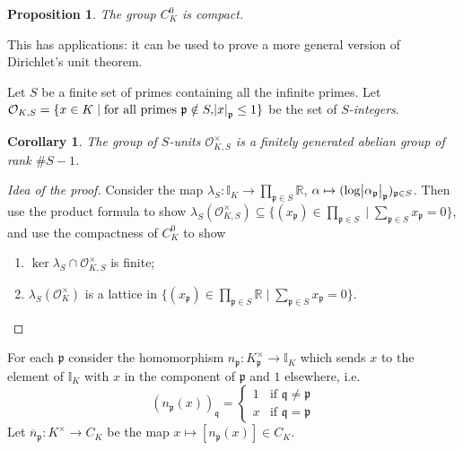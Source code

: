 \documentclass[11pt]{article}
\theoremstyle{definition}
\theoremstyle{plain}
\newtheorem{proposition}[definition]{Proposition}
\newtheorem{corollary}[definition]{Corollary}
\theoremstyle{remark}
\newcommand{\II}{\mathbb{I}}
\newcommand{\RR}{\mathbb{R}}
\newcommand{\cO}{\mathcal{O}}
\newcommand{\fp}{\mathfrak{p}}
\newcommand{\fq}{\mathfrak{q}}
\begin{document}
\begin{proposition}\label{prop:9_12}
    The group $C_K^0$ is compact.
\end{proposition}

This has applications: it can be used to prove a more general version of Dirichlet's unit theorem.

Let $S$ be a finite set of primes containing all the infinite primes. Let $\cO_{K,S} = \{x \in K \mid \text{for all primes } \fp \notin S, \abs{x}_\fp \le 1\}$ be the set of \emph{$S$-integers}.

\begin{corollary}\label{cor:9_13}
    The group of $S$-units $\cO_{K,S}^\times$ is a finitely generated abelian group of rank $\#S - 1$.
\end{corollary}
\begin{proof}[Idea of the proof]
    Consider the map $\lambda_S : \II_K \to \prod_{\fp \in S} \RR$, $\alpha \mapsto (\log \abs{\alpha_\fp}_\fp)_{\fp \in S}$. Then use the product formula to show $\lambda_S(\cO_{K,S}^\times) \subseteq \{(x_\fp) \in \prod_{\fp \in S} \mid \sum_{\fp \in S} x_\fp = 0\}$, and use the compactness of $C_K^0$ to show
    \begin{enumerate}[label=\roman*)]
        \item $\ker \lambda_S \cap \cO_{K,S}^\times$ is finite;
        \item $\lambda_S(\cO_K^\times)$ is a lattice in $\{(x_\fp) \in \prod_{\fp \in S} \RR \mid \sum_{\fp \in S} x_\fp = 0\}$. \qedhere
    \end{enumerate}
\end{proof}

For each $\fp$ consider the homomorphism $n_\fp : K_\fp^\times \to \II_K$ which sends $x$ to the element of $\II_K$ with $x$ in the component of $\fp$ and $1$ elsewhere, i.e.
\begin{equation*}
    (n_\fp(x))_\fq =
    \begin{cases}
        1 & \text{if } \fq \neq \fp\\
        x & \text{if } \fq = \fp
    \end{cases}
\end{equation*}
Let $\overline{n}_\fp : K^\times \to C_K$ be the map $x \mapsto [n_\fp(x)] \in C_K$.
\end{document}
